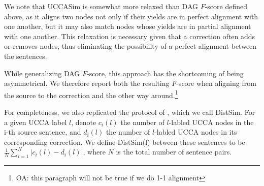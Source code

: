 \documentclass[letter,11pt]{article}
\newcommand{\oa}[1]{\footnote{\color{red}OA: #1}}
\begin{document}
We note that {\sc UCCASim} is somewhat more relaxed than DAG $F$-score defined above,
as it aligns two nodes not only if their yields are in perfect alignment with
one another, but it may also match nodes whose yields are in partial alignment
with one another. This relaxation is necessary given that a correction often adds
or removes nodes, thus eliminating the possibility of a perfect alignment between
the sentences. 


While generalizing DAG $F$-score, this approach has the shortcoming
of being asymmetrical. We therefore report both the resulting $F$-score when aligning
from the source to the correction and the other way around.\oa{this paragraph will not be
  true if we do 1-1 alignment}

For completeness, we also replicated the protocol of ,
which we call {\sc DistSim}.
For a given UCCA label $l$, denote $c_i(l)$ the number of $l$-labled UCCA nodes
in the i-th source sentence, and $d_i(l)$ the number of $l$-labled UCCA nodes
in its corresponding correction. We define {\sc DistSim}(l) between these
sentences to be $\frac{1}{N}\sum_{i=1}^N \vert c_i(l) - d_i(l) \vert$, where
$N$ is the total number of sentence pairs.


\end{document}
